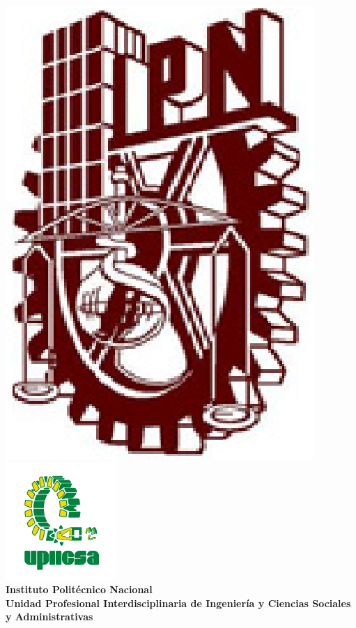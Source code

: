 \begin{titlepage}
	
	\centering %
	
	\includegraphics[scale=0.2]{imagenes/ipn} %
	\includegraphics[scale=0.65]{imagenes/upiicsa} %
	\LARGE \textbf{\\ Instituto Politécnico Nacional}
	\LARGE \textbf{\\ Unidad Profesional Interdisciplinaria de Ingeniería y Ciencias Sociales y Administrativas}
	

\end{titlepage}
